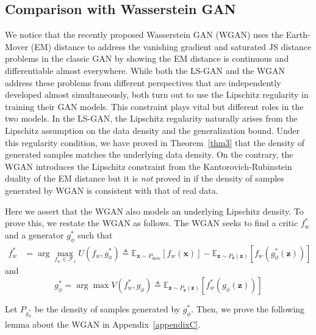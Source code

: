 
\subsection{Comparison with Wasserstein GAN}\label{sec:wgan}
We notice that the recently proposed Wasserstein GAN (WGAN) \cite{wgan17} uses the Earth-Mover (EM) distance to address the vanishing gradient and saturated JS distance problems in the classic GAN by showing the EM distance is continuous and differentiable almost everywhere.  While both the LS-GAN and the WGAN address these problems from different perspectives that are independently developed almost simultaneously, both turn out to use the Lipschitz regularity in training their GAN models. This constraint plays vital but different roles in the two models.  In the LS-GAN, the Lipschitz regularity naturally arises from the Lipschitz assumption on the data density and the generalization bound. Under this regularity condition, we have proved in Theorem~\ref{thm3} that the density of generated samples matches the underlying data density. On the contrary, the WGAN introduces the Lipschitz constraint from the Kantorovich-Rubinstein duality of the EM distance but it is {\em not} proved in \cite{wgan17} if the density of samples generated by WGAN is consistent with that of real data.

Here we assert that the WGAN also models an underlying Lipschitz density.  To prove this, we restate the WGAN as follows. The WGAN seeks to find a critic $f_w^*$ and a generator $g_\phi^*$ such that
\begin{equation}\label{eq:critic}
\begin{aligned}
f_w^* &= \arg\max_{f_w\in\mathcal F_1} U(f_w,g_\phi^*)
\triangleq\mathbb E_{\mathbf x\sim P_{data}} [f_w(\mathbf x)] - \mathbb E_{\mathbf z\sim P_{\mathbf z}(\mathbf z)} [f_w(g_\phi^*(\mathbf z))]
\end{aligned}
\end{equation}
and
\begin{equation}\label{eq:gen}
g_\phi^*=\arg\max V(f_w^*,g_\phi)\triangleq\mathbb E_{\mathbf z\sim P_{\mathbf z}(\mathbf z)} [f_w^*(g_\phi(\mathbf z))]
\end{equation}

Let $P_{g_\phi^*}$ be the density of samples generated by $g_\phi^*$. Then, we prove the following lemma about the WGAN in Appendix~\ref{appendixC}.

